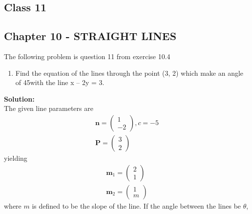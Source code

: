 \documentclass[10pt,a4paper]{report}
\newcommand{\myvec}[1]{\ensuremath{\begin{pmatrix}#1\end{pmatrix}}}
\let\vec\mathbf
\let\vec\mathbf
\renewcommand{\vec}[1]{\textbf{#1}}
\begin{document}
\onehalfspacing
\begin{center}
	\section*{\textbf{Class 11}}
	\subsection*{Chapter 10 - STRAIGHT LINES}
\end{center}
The following problem is question 11 from exercise 10.4
\begin{enumerate}
    \item Find the equation of the lines through the point (3, 2) which make an angle of 45\degree  with the line x – 2y = 3.
\end{enumerate}
\textbf{Solution:}\\
The given line parameters are
\begin{align}
   \vec{n}=\myvec{1\\-2},c=-5\\
	\vec{P}=\myvec{3\\2}
\end{align}
yielding
\begin{align}
\vec{m}_1=\myvec{2\\1}\\
\vec{m}_2=\myvec{1\\m}
\end{align}
where  $m$ is defined to be the slope of the line. If the angle between the lines be $\theta$,
\end{document}
